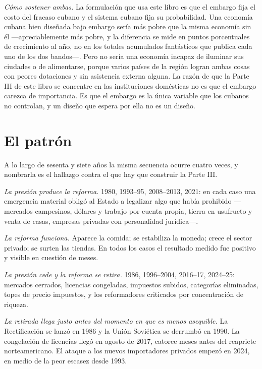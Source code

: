 \emph{Cómo sostener ambas.} La formulación que usa este libro es que el embargo fija
el costo del fracaso cubano y el sistema cubano fija su probabilidad. Una economía
cubana bien diseñada bajo embargo sería más pobre que la misma economía sin él
---apreciablemente más pobre, y la diferencia se mide en puntos porcentuales de
crecimiento al año, no en los totales acumulados fantásticos que publica cada uno de
los dos bandos---. Pero no sería una economía incapaz de iluminar sus ciudades o de
alimentarse, porque varios países de la región logran ambas cosas con peores
dotaciones y sin asistencia externa alguna. La razón de que la Parte III de este
libro se concentre en las instituciones domésticas no es que el embargo carezca de
importancia. Es que el embargo es la única variable que los cubanos no controlan, y
un diseño que espera por ella no es un diseño.

\section{El patrón}

A lo largo de sesenta y siete años la misma secuencia ocurre cuatro veces, y
nombrarla es el hallazgo contra el que hay que construir la Parte III.

\emph{La presión produce la reforma.} 1980, 1993--95, 2008--2013, 2021: en cada
caso una emergencia material obligó al Estado a legalizar algo que había prohibido
---mercados campesinos, dólares y trabajo por cuenta propia, tierra en usufructo y
venta de casas, empresas privadas con personalidad jurídica---.

\emph{La reforma funciona.} Aparece la comida; se estabiliza la moneda; crece el
sector privado; se surten las tiendas. En todos los casos el resultado medido fue
positivo y visible en cuestión de meses.

\emph{La presión cede y la reforma se retira.} 1986, 1996--2004, 2016--17,
2024--25: mercados cerrados, licencias congeladas, impuestos subidos, categorías
eliminadas, topes de precio impuestos, y los reformadores criticados por
concentración de riqueza.

\emph{La retirada llega justo antes del momento en que es menos asequible.} La
Rectificación se lanzó en 1986 y la Unión Soviética se derrumbó en 1990. La
congelación de licencias llegó en agosto de 2017, catorce meses antes del reapriete
norteamericano. El ataque a los nuevos importadores privados empezó en 2024, en
medio de la peor escasez desde 1993.

